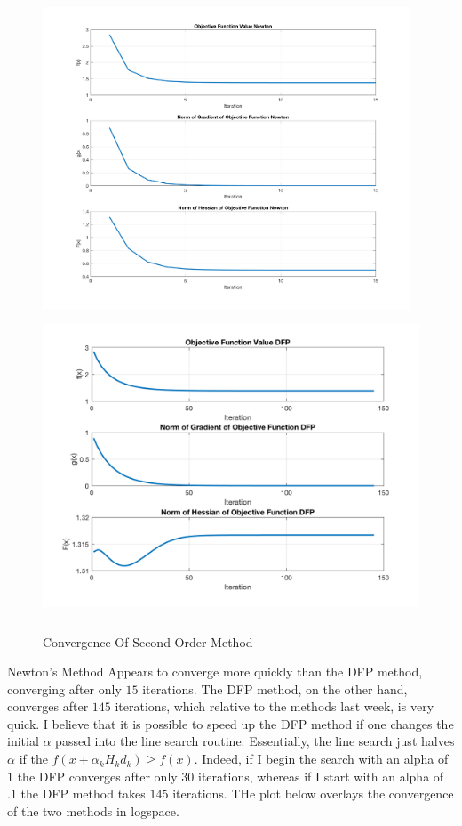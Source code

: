 \documentclass[answers]{exam}
\begin{document}
\begin{framed}
    \begin{figure}[H]
    \centering
    \caption{Convergence Of Second Order Method}
    \includegraphics[width=\linewidth, height=9cm]{NEWTON_PLOT.png}
    \includegraphics[width=\linewidth, height=9cm]{DFP_PLOT.png}
    \end{figure} 

    
    
    Newton's Method Appears to converge more quickly than the DFP method, converging after only $15$ iterations. The DFP method, on the other hand, converges after $145$ iterations, which relative to the methods last week, is very quick. I believe that it is possible to speed up the DFP method if one changes the initial $\alpha$ passed into the line search routine. Essentially, the line search just halves $\alpha$ if the $f(x + \alpha_k H_k d_k) \geq f(x)$. Indeed, if I begin the search with an alpha of $1$ the DFP converges after only $30$ iterations, whereas if I start with an alpha of $.1$ the DFP method takes $145$ iterations. THe plot below overlays the convergence of the two methods in logspace. 


\end{framed}
\end{document}

